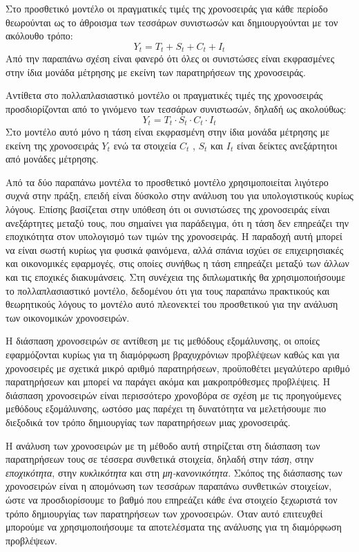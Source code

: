 Στο προσθετικό μοντέλο οι πραγματικές τιμές της χρονοσειράς για κάθε περίοδο
θεωρούνται ως το άθροισμα των τεσσάρων συνιστωσών και δημιουργούνται με τον
ακόλουθο τρόπο:\\
$$ Y_t=T_t+S_t+C_t+I_t $$
Από την παραπάνω σχέση είναι φανερό ότι όλες οι συνιστώσες είναι εκφρασμένες
στην ίδια μονάδα μέτρησης με εκείνη των παρατηρήσεων της χρονοσειράς.

Αντίθετα στο πολλαπλασιαστικό μοντέλο οι πραγματικές τιμές της χρονοσειράς
προσδιορίζονται από το γινόμενο των τεσσάρων συνιστωσών, δηλαδή ως ακολούθως:\\
$$ Y_t=T_t \cdot S_t \cdot C_t \cdot I_t $$
Στο μοντέλο αυτό μόνο η τάση είναι εκφρασμένη στην ίδια μονάδα μέτρησης με
εκείνη της χρονοσειράς $Y_t$ ενώ τα στοιχεία $C_t$ , $S_t$ και $Ι_t$ είναι δείκτες ανεξάρτητοι
από μονάδες μέτρησης.

Από τα δύο παραπάνω μοντέλα το προσθετικό μοντέλο χρησιμοποιείται λιγότερο
συχνά στην πράξη, επειδή είναι δύσκολο στην ανάλυση του για υπολογιστικούς
κυρίως λόγους. Επίσης βασίζεται στην υπόθεση ότι οι συνιστώσες της χρονοσειράς
είναι ανεξάρτητες μεταξύ τους, που σημαίνει για παράδειγμα, ότι η τάση δεν
επηρεάζει την εποχικότητα στον υπολογισμό των τιμών της χρονοσειράς. Η
παραδοχή αυτή μπορεί να είναι σωστή κυρίως για φυσικά φαινόμενα, αλλά σπάνια
ισχύει σε επιχειρησιακές και οικονομικές εφαρμογές, στις οποίες συνήθως η τάση
επηρεάζει μεταξύ των άλλων και τις εποχικές διακυμάνσεις. Στη συνέχεια της
διπλωματικής θα χρησιμοποιήσουμε το πολλαπλασιαστικό μοντέλο, δεδομένου ότι
για τους παραπάνω πρακτικούς και θεωρητικούς λόγους το μοντέλο αυτό πλεονεκτεί
του προσθετικού για την ανάλυση των οικονομικών χρονοσειρών.

Η διάσπαση χρονοσειρών σε
αντίθεση με τις μεθόδους εξομάλυνσης, οι οποίες εφαρμόζονται κυρίως για τη
διαμόρφωση βραχυχρόνιων προβλέψεων καθώς και για χρονοσειρές με σχετικά
μικρό αριθμό παρατηρήσεων, προϋποθέτει μεγαλύτερο
αριθμό παρατηρήσεων και μπορεί να παράγει ακόμα και μακροπρόθεσμες
προβλέψεις. Η διάσπαση χρονοσειρών είναι περισσότερο χρονοβόρα σε σχέση με τις
προηγούμενες μεθόδους εξομάλυνσης, ωστόσο μας παρέχει τη δυνατότητα να
μελετήσουμε πιο διεξοδικά τον τρόπο δημιουργίας των παρατηρήσεων μιας
χρονοσειράς.

Η ανάλυση των χρονοσειρών με τη μέθοδο αυτή στηρίζεται στη διάσπαση των
παρατηρήσεων τους σε τέσσερα συνθετικά στοιχεία, δηλαδή στην \textit{τάση}, στην
\textit{εποχικότητα}, στην \textit{κυκλικότητα} και στη \textit{μη-κανονικότητα}. Σκόπος της διάσπασης των
χρονοσειρών είναι η απομόνωση των τεσσάρων παραπάνω συνθετικών στοιχείων,
ώστε να προσδιορίσουμε το βαθμό που επηρεάζει κάθε ένα στοιχείο ξεχωριστά τον
τρόπο δημιουργίας των παρατηρήσεων των χρονοσειρών. Όταν αυτό επιτευχθεί
μπορούμε να χρησιμοποιήσουμε τα αποτελέσματα της ανάλυσης για τη διαμόρφωση
προβλέψεων.
